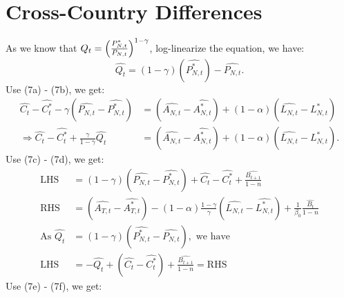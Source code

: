 \documentclass[a4paper,12pt]{article} %
\theoremstyle{nonitalic}
\begin{document}

\section{Cross-Country Differences}
As we know that $Q_t = \Bigl(\frac{P_{N,t}^*}{P_{N,t}}\Bigr)^{1-\gamma}$, log-linearize the equation, we have:
\[\widehat{Q_t} = (1-\gamma)(\widehat{P_{N,t}^*}) - \widehat{P_{N,t}}.\]
Use (7a) - (7b), we get:
\begin{align*}
    \widehat{C_t} - \widehat{C_t^*} - \gamma(\widehat{P_{N,t}} - \widehat{P_{N,t}^*}) &= (\widehat{A_{N,t}} - \widehat{A_{N,t}^*}) + (1-\alpha)(\widehat{L_{N,t}} - \widehat{L_{N,t}^*}) \\
    \Rightarrow \widehat{C_t} - \widehat{C_t^*} + \frac{\gamma}{1-\gamma}\widehat{Q_t} &= (\widehat{A_{N,t}} - \widehat{A_{N,t}^*}) + (1-\alpha)(\widehat{L_{N,t}} - \widehat{L_{N,t}^*}) \tag{9a}.
\end{align*}
Use (7c) - (7d), we get:
\begin{align*}
    \text{LHS} &= (1-\gamma)(\widehat{P_{N,t}} - \widehat{P_{N,t}^*}) + \widehat{C_t} - \widehat{C_t^*} + \frac{\widehat{B_{t+1}}}{1-n} \\
    \text{RHS} &= (\widehat{A_{T,t}} - \widehat{A_{T,t}^*}) - (1-\alpha)\frac{1-\gamma}{\gamma}(\widehat{L_{N,t}} - \widehat{L_{N,t}^*}) + \frac{1}{\beta_0} \frac{\widehat{B_t}}{1-n} \\
    \text{As } \widehat{Q_t} &= (1-\gamma)(\widehat{P_{N,t}^*} - \widehat{P_{N,t}}), \text{ we have} \\ 
    \text{LHS} &= - \widehat{Q_t} + (\widehat{C_t} - \widehat{C_t^*}) + \frac{\widehat{B_{t+1}}}{1-n} = \text{RHS} \tag{9b}
\end{align*}
Use (7e) - (7f), we get:
\end{document}
